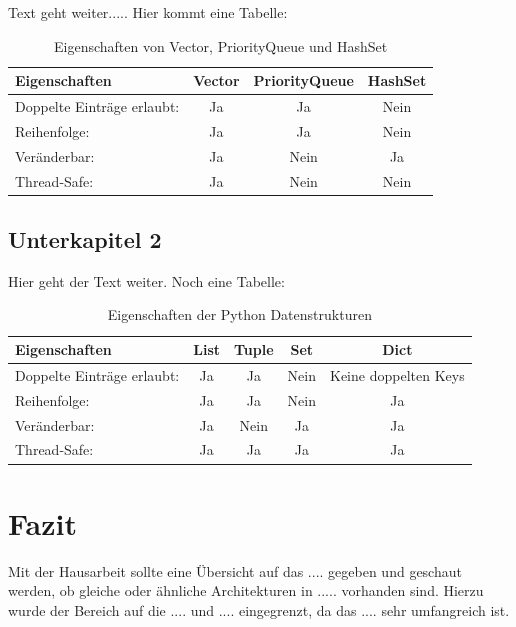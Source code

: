 \documentclass[fontsize=12pt,paper=a4,open=any,parskip=half,
  twoside=false,toc=listof,toc=bibliography,fleqn,leqno,
  captions=nooneline,captions=tableabove,british]{scrbook}
\begin{document}
Text geht weiter..... Hier kommt eine Tabelle:

\begin{table}[htbp]
\caption{Eigenschaften von Vector, PriorityQueue und HashSet}
\label{data-table}
\centering
  \begin{tabular}{l  c  c  c} 
\toprule
    Eigenschaften & Vector & PriorityQueue & HashSet\\ 
\midrule  
    Doppelte Einträge erlaubt:   		& Ja  	&  Ja  	& Nein \\
    Reihenfolge:   						& Ja 	&  Ja 		& Nein \\ 
	Veränderbar:   						& Ja	&  Nein 	& Ja \\ 
	Thread-Safe:   						& Ja 	& Nein 	& Nein\\ 
  \end{tabular}

\end{table}


\section{Unterkapitel 2}\label{ch:vector}
Hier geht der Text weiter. Noch eine Tabelle:

\begin{table}[htbp]
\caption{Eigenschaften der Python Datenstrukturen \autocite{listuple}}
\label{python-data-table}
\centering
  \begin{tabular}{l  c  c  c c} 
\toprule
    Eigenschaften & List & Tuple & Set & Dict\\ 
\midrule  
    	Doppelte Einträge erlaubt:   			& Ja  	&  Ja  		& Nein 	& Keine doppelten Keys\\
    	Reihenfolge:   						& Ja 	&  Ja 		& Nein 	& Ja\\ 
	Veränderbar:   						& Ja	&  Nein 	& Ja 		& Ja\\ 
	Thread-Safe:   						& Ja 	& Ja 	& Ja 		& Ja\\ 
  \end{tabular}

\end{table}

\chapter{Fazit}\label{ch:fazit}
Mit der Hausarbeit sollte eine Übersicht auf das .... gegeben und geschaut werden, ob gleiche oder ähnliche Architekturen in ..... vorhanden sind. Hierzu wurde der Bereich auf die .... und .... eingegrenzt, da das .... sehr umfangreich ist. \par
\end{document}
